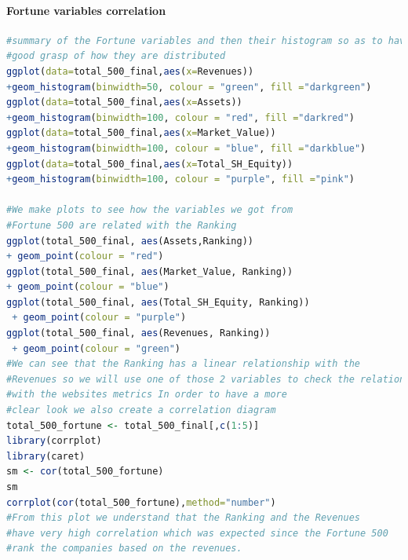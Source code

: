 \documentclass{article}
\begin{document}
\paragraph{Fortune variables correlation}\label{r: van: fortune}
\begin{lstlisting}[language=R] 
#summary of the Fortune variables and then their histogram so as to have a 
#good grasp of how they are distributed
ggplot(data=total_500_final,aes(x=Revenues))
+geom_histogram(binwidth=50, colour = "green", fill ="darkgreen")
ggplot(data=total_500_final,aes(x=Assets))
+geom_histogram(binwidth=100, colour = "red", fill ="darkred")
ggplot(data=total_500_final,aes(x=Market_Value))
+geom_histogram(binwidth=100, colour = "blue", fill ="darkblue")
ggplot(data=total_500_final,aes(x=Total_SH_Equity))
+geom_histogram(binwidth=100, colour = "purple", fill ="pink")

#We make plots to see how the variables we got from
#Fortune 500 are related with the Ranking
ggplot(total_500_final, aes(Assets,Ranking)) 
+ geom_point(colour = "red")
ggplot(total_500_final, aes(Market_Value, Ranking)) 
+ geom_point(colour = "blue")
ggplot(total_500_final, aes(Total_SH_Equity, Ranking))
 + geom_point(colour = "purple")
ggplot(total_500_final, aes(Revenues, Ranking))
 + geom_point(colour = "green")
#We can see that the Ranking has a linear relationship with the 
#Revenues so we will use one of those 2 variables to check the relationships 
#with the websites metrics In order to have a more 
#clear look we also create a correlation diagram
total_500_fortune <- total_500_final[,c(1:5)]
library(corrplot)
library(caret)
sm <- cor(total_500_fortune)
sm
corrplot(cor(total_500_fortune),method="number")
#From this plot we understand that the Ranking and the Revenues 
#have very high correlation which was expected since the Fortune 500
#rank the companies based on the revenues. 
\end{lstlisting}
\end{document}
